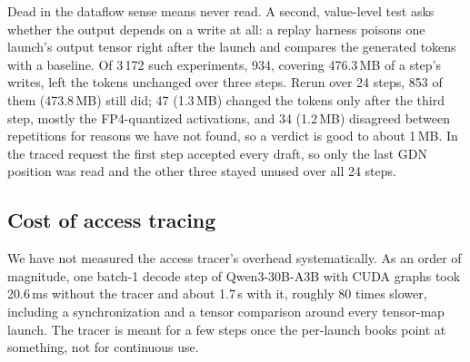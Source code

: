 Dead in the dataflow sense means never read. A second, value-level test asks whether the output
depends on a write at all: a replay harness poisons one launch's output tensor right after the
launch and compares the generated tokens with a baseline. Of 3\,172 such experiments, 934, covering 476.3\,MB of a step's writes, left the tokens unchanged
over three steps. Rerun over 24 steps, 853 of them (473.8\,MB) still did; 47 (1.3\,MB) changed the
tokens only after the third step, mostly the FP4-quantized activations, and 34 (1.2\,MB) disagreed
between repetitions for reasons we have not found, so a verdict is good to about 1\,MB. In the
traced request the first step accepted every draft, so only the last GDN position was read and the
other three stayed unused over all 24 steps.

\subsection{Cost of access tracing}\label{sec:tracecost}

We have not measured the access tracer's overhead systematically. As an order of magnitude, one
batch-1 decode step of Qwen3-30B-A3B with CUDA graphs took 20.6\,ms without the tracer and about
1.7\,s with it, roughly 80 times slower, including a synchronization and a tensor comparison around
every tensor-map launch. The tracer is meant for a few steps once the per-launch books point at
something, not for continuous use.

